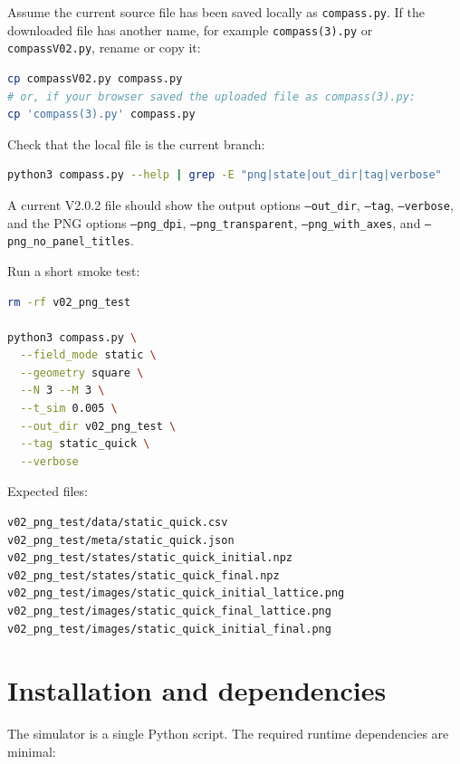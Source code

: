\documentclass[11pt,a4paper]{article}
\newcommand{\code}[1]{\texttt{#1}}
\begin{document}
Assume the current source file has been saved locally as \code{compass.py}. If the downloaded file has another name, for example \code{compass(3).py} or \code{compassV02.py}, rename or copy it:

\begin{lstlisting}[language=bash]
cp compassV02.py compass.py
# or, if your browser saved the uploaded file as compass(3).py:
cp 'compass(3).py' compass.py
\end{lstlisting}

Check that the local file is the current branch:

\begin{lstlisting}[language=bash]
python3 compass.py --help | grep -E "png|state|out_dir|tag|verbose"
\end{lstlisting}

A current V2.0.2 file should show the output options \code{--out\_dir}, \code{--tag}, \code{--verbose}, and the PNG options \code{--png\_dpi}, \code{--png\_transparent}, \code{--png\_with\_axes}, and \code{--png\_no\_panel\_titles}.

Run a short smoke test:

\begin{lstlisting}[language=bash]
rm -rf v02_png_test

python3 compass.py \
  --field_mode static \
  --geometry square \
  --N 3 --M 3 \
  --t_sim 0.005 \
  --out_dir v02_png_test \
  --tag static_quick \
  --verbose
\end{lstlisting}

Expected files:

\begin{lstlisting}[language=bash]
v02_png_test/data/static_quick.csv
v02_png_test/meta/static_quick.json
v02_png_test/states/static_quick_initial.npz
v02_png_test/states/static_quick_final.npz
v02_png_test/images/static_quick_initial_lattice.png
v02_png_test/images/static_quick_final_lattice.png
v02_png_test/images/static_quick_initial_final.png
\end{lstlisting}

\section{Installation and dependencies}
\label{sec:install}

The simulator is a single Python script. The required runtime dependencies are minimal:
\end{document}
